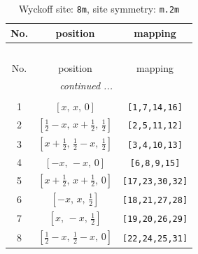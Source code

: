 \documentclass[fleqn,8pt]{jsarticle}
\begin{document}
\begin{longtable}{ccc}
\caption{Wyckoff site: {\tt 8m}, site symmetry: {\tt m.2m}}
 \\
 \hline \hline
No. & position & mapping \\ \hline \endfirsthead

\multicolumn{2}{l}{\tablename\ \thetable{}} \\
 \hline \hline
No. & position & mapping \\ \hline \endhead

 \hline \hline
\multicolumn{2}{r}{\footnotesize\it continued ...} \\ \endfoot

 \hline \hline
\multicolumn{2}{r}{} \\ \endlastfoot

1 & $\left[ x,\, x,\, 0 \right]$ & {\tt [1,7,14,16]} \\ \hline
2 & $\left[ \frac{1}{2} - x,\, x + \frac{1}{2},\, \frac{1}{2} \right]$ & {\tt [2,5,11,12]} \\ \hline
3 & $\left[ x + \frac{1}{2},\, \frac{1}{2} - x,\, \frac{1}{2} \right]$ & {\tt [3,4,10,13]} \\ \hline
4 & $\left[ - x,\, - x,\, 0 \right]$ & {\tt [6,8,9,15]} \\ \hline
5 & $\left[ x + \frac{1}{2},\, x + \frac{1}{2},\, 0 \right]$ & {\tt [17,23,30,32]} \\ \hline
6 & $\left[ - x,\, x,\, \frac{1}{2} \right]$ & {\tt [18,21,27,28]} \\ \hline
7 & $\left[ x,\, - x,\, \frac{1}{2} \right]$ & {\tt [19,20,26,29]} \\ \hline
8 & $\left[ \frac{1}{2} - x,\, \frac{1}{2} - x,\, 0 \right]$ & {\tt [22,24,25,31]} \\
\end{longtable}
\renewcommand{\arraystretch}{1.2}
\end{document}
